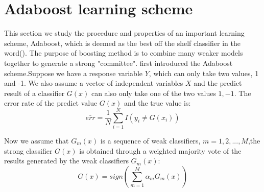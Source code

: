 \section{Adaboost learning scheme}
This section we study the procedure and properties of an important learning scheme, Adaboost, which is deemed as the best off the shelf classifier in the word(\cite{friedman2000additive}). The purpose of boosting method is to combine many weaker models together to generate a strong "committee".
\cite{freund1995desicion} first introduced the Adaboost scheme.Suppose we have a response variable $Y$, which can only take two values, 1 and -1.  We also assume a vector of independent variables $X$ and the predict result of a classifier $G(x)$ can also only take one of the two values ${1,-1}$. The error rate of the predict value $G(x)$ and the true value is:
\begin{equation}
\bar{err}=\frac{1}{N}\sum_{i=1}^{N}I(y_i\neq G(x_i))
\end{equation}

Now we assume that $G_m(x)$ is a sequence of weak classifiers, $m=1,2,...,M$,the strong classifier $G(x)$ is obtained through a weighted majority vote of the results generated by the weak classifiers $G_m(x)$:
\begin{equation}
G(x)=sign(\sum_{m=1}^{M}\alpha_m G_m(x))
\end{equation}

